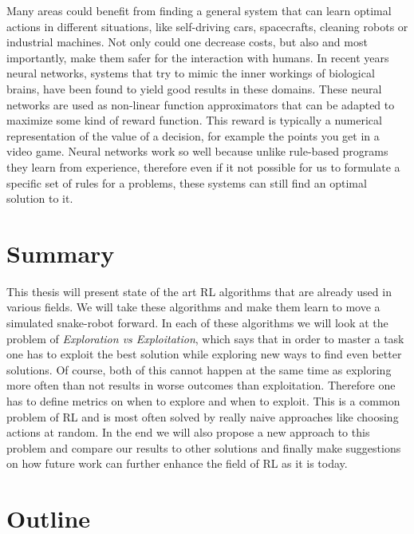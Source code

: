 Many areas could benefit from finding a general system that can learn optimal actions in different situations, like self-driving cars, spacecrafts, cleaning robots or industrial machines.
Not only could one decrease costs, but also and most importantly, make them safer for the interaction with humans.
In recent years neural networks, systems that try to mimic the inner workings of biological brains, have been found to yield good results in these domains.
These neural networks are used as non-linear function approximators that can be adapted to maximize some kind of reward function.
This reward is typically a numerical representation of the value of a decision, for example the points you get in a video game.
Neural networks work so well because unlike rule-based programs they learn from experience, therefore even if it not possible for us to formulate a specific set of rules for a problems, these systems can still find an optimal solution to it.

\section{Summary}

This thesis will present state of the art RL algorithms that are already used in various fields.
We will take these algorithms and make them learn to move a simulated snake-robot forward.
In each of these algorithms we will look at the problem of \emph{Exploration vs Exploitation}, which says that in order to master a task one has to exploit the best solution while exploring new ways to find even better solutions.
Of course, both of this cannot happen at the same time as exploring more often than not results in worse outcomes than exploitation.
Therefore one has to define metrics on when to explore and when to exploit.
This is a common problem of RL and is most often solved by really naive approaches like choosing actions at random.
In the end we will also propose a new approach to this problem and compare our results to other solutions and finally make suggestions on how future work can further enhance the field of RL as it is today.


\section{Outline}

